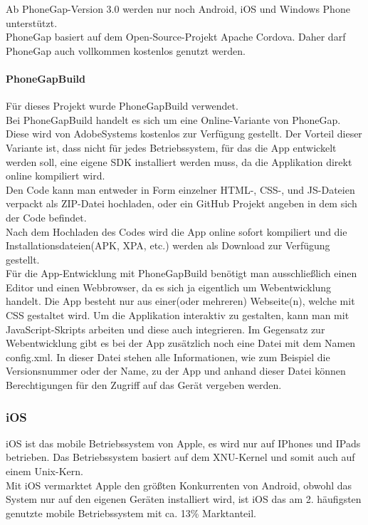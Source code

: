 Ab PhoneGap-Version 3.0 werden nur noch Android, iOS und Windows Phone unterstützt.\\

PhoneGap basiert auf dem Open-Source-Projekt Apache Cordova. Daher darf PhoneGap auch vollkommen kostenlos genutzt werden.\\
\paragraph{PhoneGapBuild\\}
Für dieses Projekt wurde PhoneGapBuild verwendet.\\
Bei PhoneGapBuild handelt es sich um eine Online-Variante von PhoneGap. Diese wird von AdobeSystems kostenlos zur Verfügung gestellt. Der Vorteil dieser Variante ist, dass nicht für jedes Betriebssystem, für das die App entwickelt werden soll, eine eigene SDK installiert werden muss, da die Applikation direkt online kompiliert wird.\\
Den Code kann man entweder in Form einzelner HTML-, CSS-, und JS-Dateien verpackt als ZIP-Datei hochladen, oder ein GitHub Projekt angeben in dem sich der Code befindet.\\
Nach dem Hochladen des Codes wird die App online sofort kompiliert und die Installationsdateien(APK, XPA, etc.) werden als Download zur Verfügung gestellt.\\

Für die App-Entwicklung mit PhoneGapBuild benötigt man ausschließlich einen Editor und einen Webbrowser, da es sich ja eigentlich um Webentwicklung handelt. Die App besteht nur aus einer(oder mehreren) Webseite(n), welche mit CSS gestaltet wird. Um die Applikation interaktiv zu gestalten, kann man mit JavaScript-Skripts arbeiten und diese auch integrieren. Im Gegensatz zur Webentwicklung gibt es bei der App zusätzlich noch eine Datei mit dem Namen config.xml. In dieser Datei stehen alle Informationen, wie zum Beispiel die Versionsnummer oder der Name, zu der App und anhand dieser Datei können Berechtigungen für den Zugriff auf das Gerät vergeben werden.\\

\subsubsection{iOS}
iOS ist das mobile Betriebssystem von Apple, es wird nur auf IPhones und IPads betrieben. Das Betriebssystem basiert auf dem XNU-Kernel und somit auch auf einem Unix-Kern.\\
Mit iOS vermarktet Apple den größten Konkurrenten von Android, obwohl das System nur auf den eigenen Geräten installiert wird, ist iOS das am 2. häufigsten genutzte mobile Betriebssystem mit ca. 13\% Marktanteil.\\
